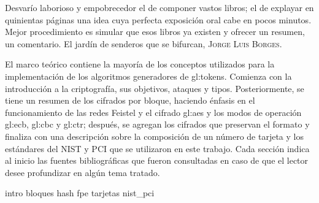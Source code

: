 %
%

{
  \epigrafe
  {%
    Desvarío laborioso y empobrecedor el de componer vastos libros; el de
    explayar en quinientas páginas una idea cuya perfecta exposición oral cabe
    en pocos minutos. Mejor procedimiento es simular que esos libros ya existen
    y ofrecer un resumen, un comentario.%
  }
  {%
    El jardín de senderos que se bifurcan,
    \textsc{Jorge Luis Borges}.%
  }
}

\noindent
El marco teórico contiene la mayoría de los conceptos utilizados para la
implementación de los algoritmos generadores de \glspl{gl:token}. Comienza con
la introducción a la criptografía, sus objetivos, ataques y tipos.
Posteriormente, se tiene un resumen de los cifrados por bloque, haciendo énfasis
en el funcionamiento de las redes Feistel y el cifrado \gls{gl:aes} y los modos
de operación \gls{gl:ecb}, \gls{gl:cbc} y \gls{gl:ctr}; después, se agregan los
cifrados que preservan el formato y finaliza con una descripción sobre la
composición de un número de tarjeta y los estándares del NIST y PCI que se
utilizaron en este trabajo. Cada sección indica al inicio las fuentes
bibliográficas que fueron consultadas en caso de que el lector desee
profundizar en algún tema tratado.

{intro}
{bloques}
{hash}
{fpe}
{tarjetas}
{nist_pci}
